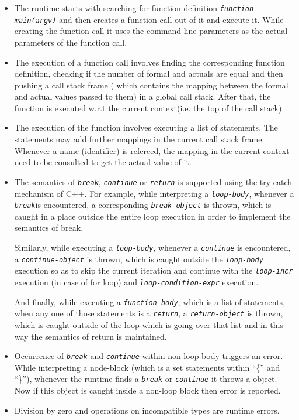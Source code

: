 \documentclass[12,twoside]{article}
\begin{document}
\begin{itemize}

  \item The runtime starts with searching for function definition
  {\tt\emph{function main(argv)}} and then creates a function call out of it and 
  execute it.  While creating the function call it uses the command-line 
  parameters as the actual parameters of the function call.

  \item The execution of a function call involves finding the corresponding 
  function definition, checking if the number of formal and actuals are equal 
  and then pushing a call stack frame ( which contains the mapping between the 
      formal and actual values passed to them) in a global call stack. After 
  that, the function
  is executed w.r.t the current context(i.e. the top of the call stack).

  \item The execution of the function involves executing a list of statements.
  The statements may add further mappings in the current call stack frame.
  Whenever a name (identifier) is refereed, the mapping in the current context 
  need to be consulted to get the actual value of it. 

  \item The semantics of {\tt\emph{break}}, {\tt\emph{continue}} or 
{\tt\emph{return}} is supported using the try-catch mechanism of C++.
  For example, while interpreting a {\tt\emph{loop-body}}, whenever a {\tt\emph{break}}is 
  encountered, a corresponding {\tt\emph{break-object}} is thrown, which is caught in a place 
  outside the entire loop execution in order to implement the semantics of break. 

  Similarly, while executing a {\tt\emph{loop-body}}, whenever a 
{\tt\emph{continue}} is encountered, a {\tt\emph{continue-object}} is thrown, which is caught outside
  the {\tt\emph{loop-body}} execution so as to skip the current iteration 
    and continue with the {\tt\emph{loop-incr}} execution (in case of for loop) 
    and {\tt\emph{loop-condition-expr}} execution.

  And finally, while executing a  {\tt\emph{function-body}}, which is a list
  of statements, when any one of those statements is a {\tt\emph{return}}, a 
  {\tt\emph{return-object}} is thrown, which is caught outside of the loop
  which is going over that list and in this way the semantics of return is 
    maintained.
  
  \item Occurrence of {\tt\emph{break}} and {\tt\emph{continue}} within non-loop
    body triggers an error. While interpreting a node-block (which is a set 
        statements within ``\{'' and ``\}''), whenever the runtime finds a 
{\tt\emph{break}} or  {\tt\emph{continue}} it throws a object. Now if this 
object is caught
  inside a non-loop block then error is reported.

  \item Division by zero and operations on incompatible types are runtime 
  errors.  
  
  \end{itemize}
\end{document}
